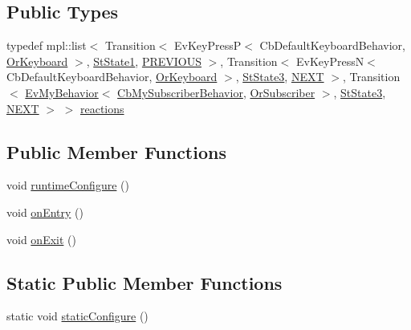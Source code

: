 \subsection*{Public Types}
\begin{DoxyCompactItemize}
\item 
typedef mpl\+::list$<$ Transition$<$ Ev\+Key\+PressP$<$ Cb\+Default\+Keyboard\+Behavior, \hyperlink{classsm__ferrari_1_1OrKeyboard}{Or\+Keyboard} $>$, \hyperlink{structsm__ferrari_1_1StState1}{St\+State1}, \hyperlink{structsm__ferrari_1_1StState2_1_1PREVIOUS}{P\+R\+E\+V\+I\+O\+US} $>$, Transition$<$ Ev\+Key\+PressN$<$ Cb\+Default\+Keyboard\+Behavior, \hyperlink{classsm__ferrari_1_1OrKeyboard}{Or\+Keyboard} $>$, \hyperlink{structsm__ferrari_1_1StState3}{St\+State3}, \hyperlink{structsm__ferrari_1_1StState2_1_1NEXT}{N\+E\+XT} $>$, Transition$<$ \hyperlink{structsm__ferrari_1_1cl__subscriber_1_1EvMyBehavior}{Ev\+My\+Behavior}$<$ \hyperlink{classsm__ferrari_1_1cl__subscriber_1_1CbMySubscriberBehavior}{Cb\+My\+Subscriber\+Behavior}, \hyperlink{classsm__ferrari_1_1OrSubscriber}{Or\+Subscriber} $>$, \hyperlink{structsm__ferrari_1_1StState3}{St\+State3}, \hyperlink{structsm__ferrari_1_1StState2_1_1NEXT}{N\+E\+XT} $>$ $>$ \hyperlink{structsm__ferrari_1_1StState2_aa8b58bdd5dffaa1e89dd7adfde215ab4}{reactions}
\end{DoxyCompactItemize}
\subsection*{Public Member Functions}
\begin{DoxyCompactItemize}
\item 
void \hyperlink{structsm__ferrari_1_1StState2_a9bcdeff671e5e19eb07a32bedca1f161}{runtime\+Configure} ()
\item 
void \hyperlink{structsm__ferrari_1_1StState2_ad2bd9cb574de21ba35dcd81868a2cf8a}{on\+Entry} ()
\item 
void \hyperlink{structsm__ferrari_1_1StState2_a4b8c24281cf71ebfc54d280886de30ca}{on\+Exit} ()
\end{DoxyCompactItemize}
\subsection*{Static Public Member Functions}
\begin{DoxyCompactItemize}
\item 
static void \hyperlink{structsm__ferrari_1_1StState2_a7767abca55071ed12ae3334b0a720c7c}{static\+Configure} ()
\end{DoxyCompactItemize}
